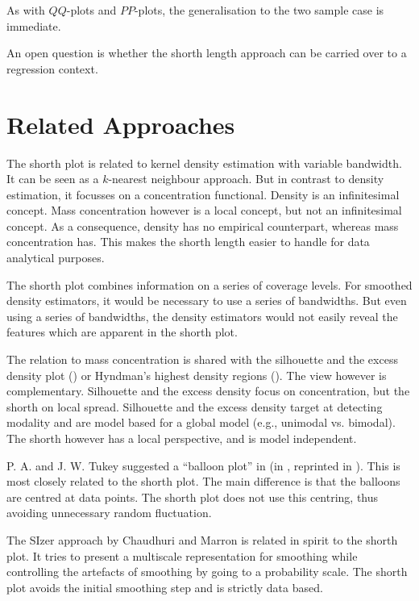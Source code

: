 \documentclass[dvips,12pt,a4paper,twoside]{amsart}
\newcommand{\gsnote}[1]{}
\newcommand{\gsnote}[1]{\marginpar{\textcolor{green}{#1}}}%
\begin{document}
As with $QQ$-plots and $PP$-plots, the generalisation to the two sample case is immediate.

An open question is whether the shorth length approach can be carried over to a regression context.

\section{Related Approaches}
The shorth plot is related to kernel density estimation with variable bandwidth. It can be seen as a $k$-nearest neighbour approach. But in contrast to density estimation, it focusses on a concentration functional. Density is an infinitesimal concept. Mass concentration however is a local concept, but not an infinitesimal concept. As a consequence, density has no empirical counterpart, whereas mass concentration has. This makes the shorth length easier to handle for data analytical purposes.

\gsnote{added 20071028}
The shorth plot combines information on a series of coverage levels. For smoothed density estimators, it would be necessary to use a series of bandwidths. But even using  a series of bandwidths, the density estimators would not easily reveal the features which are apparent in the shorth plot.

The relation to mass concentration is shared with the silhouette and the excess density plot  (\cite{dwmgs91jasa}) or Hyndman's highest density regions (\cite{Hyndman1996Computing-and-G}). The view however is complementary. Silhouette and the excess density focus on concentration, but the shorth on local spread. Silhouette and the excess density  target at detecting modality and are model based for a global model (e.g., unimodal vs. bimodal). The shorth however has a local perspective, and is model independent.

P. A. and J. W. Tukey suggested a ``balloon plot'' in \cite{Tukey1981Data-Driven-Vie} (in \cite{Barnett1981Looking-at-mult}, reprinted in \cite{Tukey1988collected-V}). This is most closely related to the shorth plot. The main difference is that the balloons are centred at data points. The shorth plot does not use this centring, thus avoiding unnecessary random fluctuation.

The SIzer approach by Chaudhuri and Marron \cite{Chaudhuri1999SiZer-for-Explo} is related in spirit to the shorth plot. It tries to present a multiscale representation for smoothing while controlling the artefacts of smoothing by going to a probability scale. The shorth plot avoids the initial smoothing step and is strictly data based.
\end{document}
